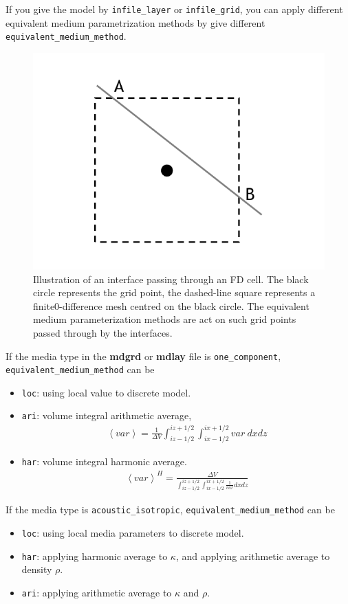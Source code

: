 If you give the model by \texttt{infile\_layer} or \texttt{infile\_grid}, you can apply different equivalent medium parametrization methods by give different \texttt{equivalent\_medium\_method}. 

\begin{figure}[H]
\centering 
  \includegraphics[width=0.3\linewidth]{figure/grid_inclined.pdf}
  \caption{Illustration of an interface passing through an FD cell. The black circle represents the grid point, the dashed-line square represents a finite0-difference mesh centred on the black circle. The equivalent medium parameterization methods are act on such grid points passed through by the interfaces.}
  \label{equi_grid}
\end{figure}

If the media type in the \textbf{mdgrd} or \textbf{mdlay} file is \texttt{one\_component}, \texttt{equivalent\_medium\_method} can be
\begin{itemize}
 \item \texttt{loc}: using local value to discrete model. 
 \item \texttt{ari}: volume integral arithmetic average, 
  \begin{align}
    \left<var\right> = \frac{1}{\Delta V} \int_{iz-1/2}^{iz+1/2} \int_{ix-1/2}^{ix+1/2} var~dx dz
  \end{align}
 \item \texttt{har}: volume integral harmonic average. 
  \begin{align}
    \left<var\right>^H = \frac{\Delta V}{\int_{iz-1/2}^{iz+1/2} \int_{ix-1/2}^{ix+1/2} \frac{1}{var} dx dz}
  \end{align}
\end{itemize}

If the media type is \texttt{acoustic\_isotropic}, \texttt{equivalent\_medium\_method} can be
\begin{itemize}
 \item \texttt{loc}: using local media parameters to discrete model. 
 \item \texttt{har}: applying harmonic average to $\kappa$, and applying arithmetic average to density $\rho$. 
 \item \texttt{ari}: applying arithmetic average to $\kappa$ and $\rho$. 
\end{itemize}


